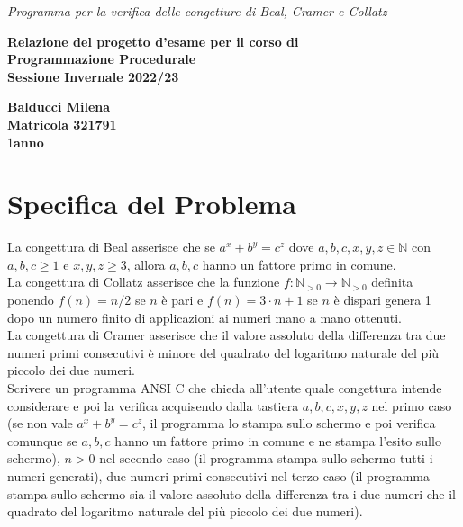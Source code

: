\documentclass[10pt]{report}
\begin{document}
\begin{titlepage}
   
    \vspace{60mm}
    
    \begin{center}
    {\LARGE\emph{Programma per la verifica delle congetture di Beal, Cramer e Collatz}} 
    \end{center}
    
    \vspace{10mm}
    
    \begin{center}
    {\LARGE{\bf Relazione del progetto d'esame per il corso di \\Programmazione Procedurale \\ 
    \vspace{3mm} Sessione Invernale 2022/23 }}
    \end{center}
    
    \vspace{30mm} \par \noindent
    
    \begin{center}
    {\large{\bf Balducci Milena\\
    Matricola 321791\\
    $1$\textdegree anno}}
    \end{center}
    \vspace{20mm}
\end{titlepage}

\newpage

\section{Specifica del Problema}
La congettura di Beal asserisce che se $a^x + b^y = c^z$ dove $a,b,c,x,y,z \in \mathbb{N}$ con $a,b,c\ge1$ e $x,y,z\ge3$, allora $a,b,c$ hanno un fattore primo in comune.\\ 
La congettura di Collatz asserisce che la funzione $f:\mathbb{N}_{>0}\longrightarrow\mathbb{N}_{>0}$ definita ponendo $f(n) = n/2$ se $n$ è pari e $f(n) = 3 \cdot n + 1$ se $n$ 
è dispari genera 1 dopo un numero finito di applicazioni ai numeri mano a mano ottenuti.\\ 
La congettura di Cramer asserisce che il valore assoluto della differenza tra due numeri primi consecutivi è minore del quadrato del logaritmo naturale del più piccolo dei due 
numeri.\\ 
Scrivere un programma ANSI C che chieda all'utente quale congettura intende considerare e poi la verifica acquisendo dalla tastiera $a,b,c,x,y,z$ nel primo caso 
(se non vale  $a^x + b^y = c^z$, il programma lo stampa sullo schermo e poi verifica comunque se $a,b,c$ hanno un fattore primo in comune e ne stampa l'esito sullo schermo), 
$n>0$ nel secondo caso (il programma stampa sullo schermo tutti i numeri generati), due numeri primi consecutivi nel terzo caso 
(il programma stampa sullo schermo sia il valore assoluto della differenza tra i due numeri che il quadrato del logaritmo naturale del più piccolo dei due numeri). 
\end{document}
